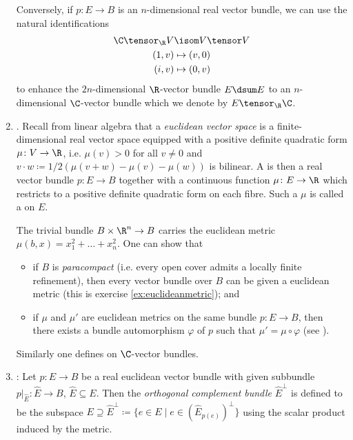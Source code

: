 \begin{definition}
\begin{enumerate}[resume]
			Conversely, if $p\colon E \to B$ is an $n$-dimensional real vector bundle, we can use the natural identifications
			\begin{align*}
				\C \tensor_{\R} V &\isom V \tensor V \\
				(1, v) &\mapsto (v, 0) \\
				(i, v) &\mapsto (0, v)
			\end{align*}
			to enhance the $2n$-dimensional $\R$-vector bundle $E \dsum E$ to an $n$-dimensional $\C$-vector bundle which we denote by  $E \tensor_{\R} \C$.
		\item {}.
			Recall from linear algebra that a \emph{euclidean vector space} is a finite-dimensional real vector space equipped with a positive definite quadratic form $\mu\colon V \to \R$, i.e. $\mu(v) > 0$ for all $v \neq 0$ and $v \cdot w \coloneq 1 / 2 (\mu(v + w) - \mu(v) - \mu(w))$ is bilinear.
			A  is then a real vector bundle $p\colon E \to B$ together with a continuous function $\mu\colon E \to \R$ which restricts to a positive definite quadratic form on each fibre.
			Such a $\mu$ is called a  on $E$.
			\begin{example}
				The trivial bundle $B \times \R^n \to B$ carries the euclidean metric $\mu(b, x) = x_1^2 + \ldots + x_n^2$.
				One can show that
				\begin{itemize}
					\item if $B$ is \emph{paracompact} (i.e. every open cover admits a locally finite refinement), then every vector bundle over $B$ can be given a euclidean metric (this is exercise \ref{ex:euclideanmetric}); and 
					\item if $\mu$ and $\mu'$ are euclidean metrics on the same bundle $p\colon E \to B$, then there exists a bundle automorphism $\varphi$ of $p$ such that $\mu' = \mu \circ \varphi$ (see \cite[Exercise 2-E]{milnor_characteristic_1974}).
				\end{itemize}
			\end{example}
			Similarly one defines  on $\C$-vector bundles.
		\item {}:
			Let $p\colon E \to B$ be a real euclidean vector bundle with given subbundle $p|_{\hat{E}}\colon \hat{E} \to B$, $\hat{E} \subseteq E$.
			Then the \emph{orthogonal complement bundle} $\hat{E}^\perp$ is defined to be the subspace $E \supseteq \hat{E}^\perp \coloneq \big\{e \in E \mid e \in (\hat{E}_{p(e)})^\perp\big\}$ using the scalar product induced by the metric.


\end{enumerate}
\end{definition}
